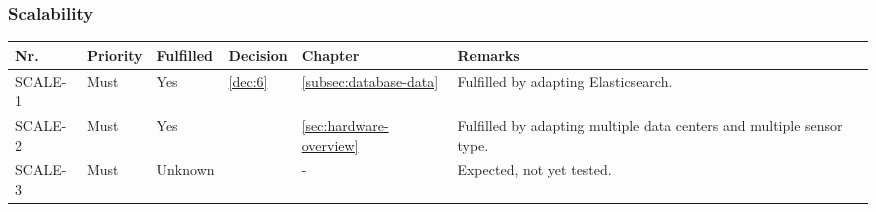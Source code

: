 \subsubsection{Scalability}
\begin{table}[H]
	\centering
	\begin{tabular}{lllllL{}}
						    
		Nr.     & Priority & Fulfilled & Decision & Chapter & Remarks \\ \hline
		SCALE-1 & Must     & Yes      & \ref{dec:6} & \ref{subsec:database-data} & Fulfilled by adapting Elasticsearch. \\ \hline
		SCALE-2 & Must     & Yes      & & \ref{sec:hardware-overview} & Fulfilled by adapting multiple data centers and multiple sensor type. \\ \hline
		SCALE-3 & Must     & Unknown  & & -         & Expected, not yet tested. \\ \hline
						
	\end{tabular}
\end{table}

\clearpage


